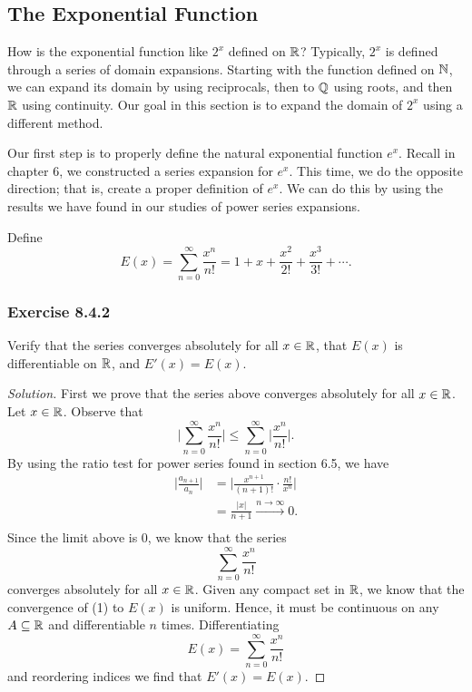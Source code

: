 \subsection{The Exponential Function} 

How is the exponential function like \( 2^{x}  \) defined on \( \mathbb{R}  \)? Typically, \( 2^{x} \) is defined through a series of domain expansions. Starting with the function defined on \( \mathbb{N}  \), we can expand its domain by using reciprocals, then to \(  \mathbb{Q}  \) using roots, and then \( \mathbb{R}  \) using continuity. Our goal in this section is to expand the domain of \( 2^{x }   \) using a different method. 

Our first step is to properly define the natural exponential function \( e^{x}  \). Recall in chapter 6, we constructed a series expansion for \( e^{x}  \). This time, we do the opposite direction; that is, create a proper definition of \( e^{x}  \). We can do this by using the results we have found in our studies of power series expansions. 

Define 
\[  E(x) = \sum_{ n=0  }^{ \infty  } \frac{ x^{n}  }{  n!  } = 1 + x + \frac{ x^{2}  }{ 2!  } + \frac{ x^{3} }{ 3!  } + \dotsb . \]

\subsubsection{Exercise 8.4.2} Verify that the series converges absolutely for all \( x \in \mathbb{R}  \), that \( E(x)  \) is differentiable on \( \mathbb{R}  \), and \( E'(x) = E(x)  \).
\begin{proof}[Solution]
First we prove that the series above converges absolutely for all \( x \in \mathbb{R}  \). Let \( x \in \mathbb{R}  \). Observe that 
\[  \Big| \sum_{ n=0  }^{ \infty  } \frac{ x^{n}  }{  n!  }  \Big| \leq \sum_{ n=0  }^{ \infty  } \Big| \frac{ x^{n}  }{ n!  }  \Big|.    \] By using the ratio test for power series found in section 6.5, we have
\begin{align*}
    \Big| \frac{ a_{n+1} }{ a_{n} }  \Big| &= \Big| \frac{ x^{n+1} }{ (n+1)!  } \cdot \frac{ n!  }{ x^{n} }  \Big|  \\
                                           &= \frac{ | x  |  }{ n+1  } \xrightarrow{n\rightarrow\infty} 0. \\
\end{align*}
Since the limit above is \(  0  \), we know that the series 
\[  \sum_{ n=0  }^{ \infty  } \frac{ x^{n}  }{  n!  } \tag{1} \] converges absolutely for all \( x \in \mathbb{R}  \). Given any compact set in \( \mathbb{R}  \), we know that the convergence of (1) to \( E(x)  \) is uniform. Hence, it must be continuous on any \( A \subseteq \mathbb{R}  \) and differentiable \( n  \) times. Differentiating 
\[  E(x) = \sum_{ n= 0 }^{ \infty  } \frac{ x^{n}  }{ n!  }  \] and reordering indices we find that \( E'(x) = E(x)  \).
\end{proof}

